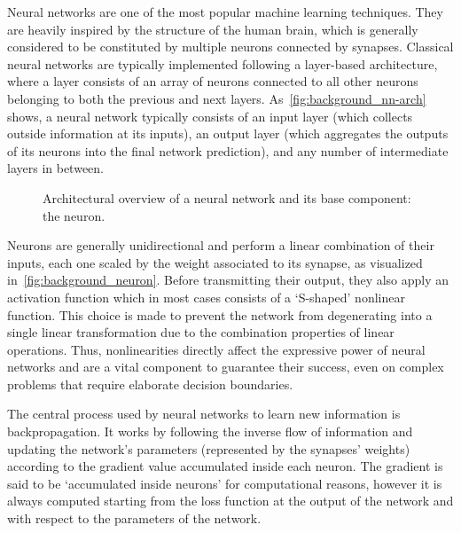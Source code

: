 Neural networks are one of the most popular machine learning techniques.
They are heavily inspired by the structure of the human brain, which is generally considered to be constituted by multiple neurons connected by synapses.
Classical neural networks are typically implemented following a layer-based architecture, where a layer consists of an array of neurons connected to all other neurons belonging to both the previous and next layers.
As~\cref{fig:background_nn-arch} shows, a neural network typically consists of an input layer (which collects outside information at its inputs), an output layer (which aggregates the outputs of its neurons into the final network prediction), and any number of intermediate layers in between.

\begin{figure}[t!]
    \centering
    \quad
    \caption{Architectural overview of a neural network and its base component: the neuron.}
    \label{fig:background_nn-arch_neuron}
\end{figure}

Neurons are generally unidirectional and perform a linear combination of their inputs, each one scaled by the weight associated to its synapse, as visualized in~\cref{fig:background_neuron}.
Before transmitting their output, they also apply an activation function which in most cases consists of a `S-shaped' nonlinear function.
This choice is made to prevent the network from degenerating into a single linear transformation due to the combination properties of linear operations.
Thus, nonlinearities directly affect the expressive power of neural networks and are a vital component to guarantee their success, even on complex problems that require elaborate decision boundaries.

The central process used by neural networks to learn new information is backpropagation.
It works by following the inverse flow of information and updating the network's parameters (represented by the synapses' weights) according to the gradient value accumulated inside each neuron.
The gradient is said to be `accumulated inside neurons' for computational reasons, however it is always computed starting from the loss function at the output of the network and with respect to the parameters of the network.

